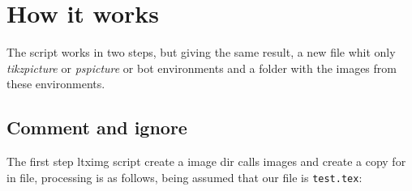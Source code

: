 \documentclass[11pt]{article}
\begin{document}
\section{How it works}

The script works in two steps, but giving the same result, a new file whit only 
\emph{tikzpicture} or \emph{pspicture} or bot environments and a folder with the images from
these environments.

\subsection{Comment and ignore}

The first step \textsf{ltximg } script create a image dir calls \textsf{images} 
and create a copy for in file, processing is as follows, being assumed that our file is \texttt{test.tex}:
\end{document}
